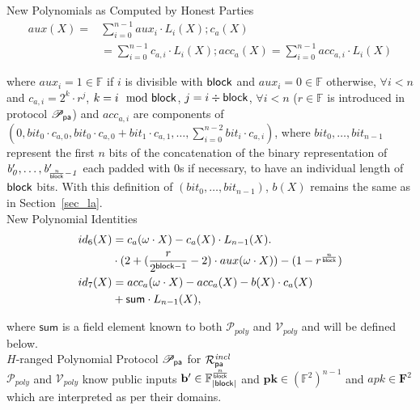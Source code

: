 \noindent \textsf{New Polynomials as Computed by Honest Parties} 
\begin{align*}
aux(X) = & \sum_{i=0}^{n-1}aux_i \cdot L_i(X); c_{a}(X) \\
& = \sum_{i=0}^{n-1} c_{a,i} \cdot L_i(X); acc_{a}(X)  =  \sum_{i=0}^{n-1} acc_{a,i}  \cdot L_i(X)
\end{align*}

\noindent where $aux_{i} = 1 \in \mathbb{F}$ if $i$ is divisible with $\mathsf{block}$ and $aux_{i} = 0 \in \mathbb{F}$ otherwise, $\forall i < n$ 
and $c_{a,i} = 2^k \cdot r^j$, $k = i \mod {\mathsf{block}}$, $j = i \div \mathsf{block}$, $\forall i < n$ ($r \in \mathbb{F}$ is introduced in protocol $\mathscr{P}_{\mathsf{pa}}$) and $acc_{a,i}$ are components of $(0, \mathit{bit}_0 \cdot c_{a,0}, \mathit{bit}_0 \cdot c_{a,0}+ \mathit{bit}_1  \cdot c_{a,1}, \ldots, \sum_{i=0}^{n-2}\mathit{bit}_i \cdot c_{a,i})$, where $\mathit{bit_{0}}, \ldots, \mathit{bit_{n-1}}$ represent the first $n$ 
bits of the concatenation of the binary representation of 
$\mathit{b'_{0}}, \ldots, \mathit{b'_{\frac{n}{\mathsf{block}}-1}}$ each 
padded  with 0s  if necessary, to have an individual length of $\mathsf{block}$ bits. With this definition of $(\mathit{bit_{0}}, \ldots, \mathit{bit_{n-1}})$, $b(X)$ remains the same as in Section~\ref{sec_la}.\\

\noindent \textsf{New Polynomial Identities} 
\begin{align*}
id_6(X) & =  c_{a}(\omega \cdot X) - c_{a}(X) \cdot L_{n-1}(X). \\
& \cdot (2+ (\frac{r}{2^{\mathsf{block} -1}} -2)  \cdot aux(\omega \cdot X)) - (1 - r^{\frac{n}{\mathsf{block}}}) \\
id_7(X) & = acc_{a}(\omega \cdot X) - acc_{a}(X) - b(X)\cdot c_{a}(X)  \\
& +  \mathsf{sum} \cdot L_{n-1}(X),
\end{align*}

\noindent where $\mathsf{sum}$ is a field element known to both $\mathcal{P}_{poly}$ and $\mathcal{V}_{poly}$ and will be defined below. \\ 

\noindent \textsf{$H$-ranged Polynomial Protocol $\mathscr{P}_{\mathsf{pa}}$ for $\mathcal{R}^{\mathit{incl}}_{\mathsf{pa}}$} \\


\noindent $\mathcal{P}_{poly}$ and $\mathcal{V}_{poly}$ know public inputs 
$\mathbf{b'} \in \mathbb{F}_{|\mathsf{block}|}^{\frac{n}{\mathsf{block}}}$ and 
$\mathbf{pk} \in (\mathbb{F}^2)^{n-1} $ and $\mathit{apk} \in \mathbf{F}^2$ which are interpreted as per their domains. 

